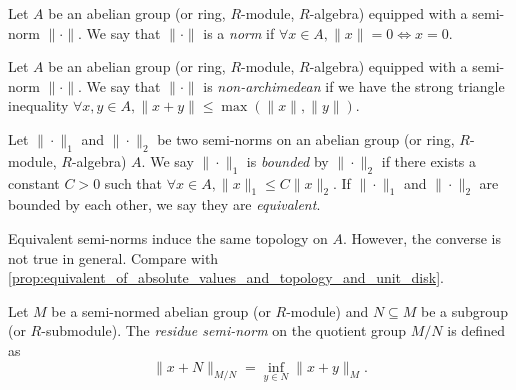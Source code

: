     \begin{definition}\label{def:normed_group_rings_modules_and_algebras}
        Let \(A\) be an abelian group (or ring, \(R\)-module, \(R\)-algebra) equipped with a semi-norm \(\|\cdot\|\).
        We say that \(\|\cdot\|\) is a \emph{norm} if \(\forall x \in A, \|x\| = 0 \iff x = 0\).
    \end{definition}

    \begin{definition}\label{def:nonarchimedean_seminorm}
        Let \(A\) be an abelian group (or ring, \(R\)-module, \(R\)-algebra) equipped with a semi-norm \(\|\cdot\|\).
        We say that \(\|\cdot\|\) is \emph{non-archimedean} if we have the strong triangle inequality
        \(\forall x,y \in A, \|x + y\| \leq \max(\|x\|, \|y\|)\).
    \end{definition}

    \begin{definition}\label{def:bounded_semi-norm}
        Let \(\|\cdot\|_1\) and \(\|\cdot\|_2\) be two semi-norms on an abelian group (or ring, \(R\)-module, \(R\)-algebra) \(A\).
        We say \(\|\cdot\|_1\) is \emph{bounded} by \(\|\cdot\|_2\) if there exists a constant \(C > 0\) such that \(\forall x \in A, \|x\|_1 \leq C\|x\|_2\).
        If \(\|\cdot\|_1\) and \(\|\cdot\|_2\) are bounded by each other, we say they are \emph{equivalent}.
    \end{definition}

    \begin{remark}\label{rmk:semi-norms_bounded_by_each_other_induces_the_same_topologies}
        Equivalent semi-norms induce the same topology on \(A\).
        However, the converse is not true in general.
        Compare with \cref{prop:equivalent_of_absolute_values_and_topology_and_unit_disk}.

    \end{remark}

    \begin{definition}\label{def:residue_semi-norm}
        Let \(M\) be a semi-normed abelian group (or \(R\)-module) and \(N \subseteq M\) be a subgroup (or \(R\)-submodule).
        The \emph{residue semi-norm} on the quotient group \(M/N\) is defined as
        \[
            \|x + N\|_{M/N} = \inf_{y \in N} \|x + y\|_M.
        \]
    \end{definition}

